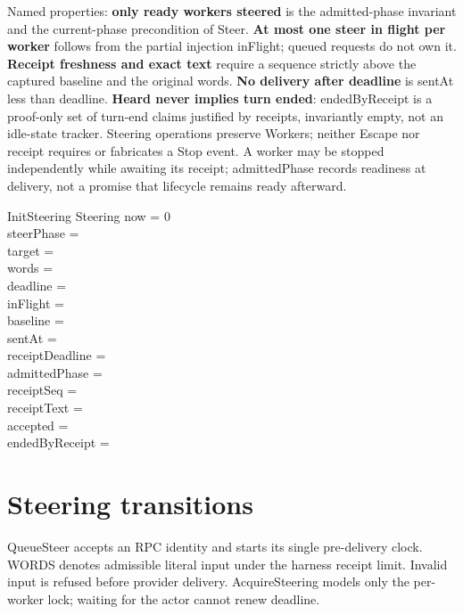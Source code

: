 \documentclass[a4paper,10pt,fleqn]{article}
\begin{document}
Named properties: \textbf{only ready workers steered} is the admitted-phase
invariant and the current-phase precondition of Steer. \textbf{At most one
steer in flight per worker} follows from the partial injection inFlight;
queued requests do not own it. \textbf{Receipt freshness and exact text}
require a sequence strictly above the captured baseline and the original
words. \textbf{No delivery after deadline} is sentAt less than deadline.
\textbf{Heard never implies turn ended}: endedByReceipt is a proof-only set of
turn-end claims justified by receipts, invariantly empty, not an idle-state
tracker. Steering operations preserve Workers; neither Escape nor receipt
requires or fabricates a Stop event. A worker may be stopped independently
while awaiting its receipt; admittedPhase records readiness at delivery, not
a promise that lifecycle remains ready afterward.

\begin{schema}{InitSteering}
  Steering
\where
  now = 0 \\
  steerPhase = \emptyset \\
  target = \emptyset \\
  words = \emptyset \\
  deadline = \emptyset \\
  inFlight = \emptyset \\
  baseline = \emptyset \\
  sentAt = \emptyset \\
  receiptDeadline = \emptyset \\
  admittedPhase = \emptyset \\
  receiptSeq = \emptyset \\
  receiptText = \emptyset \\
  accepted = \emptyset \\
  endedByReceipt = \emptyset
\end{schema}

\section{Steering transitions}

QueueSteer accepts an RPC identity and starts its single pre-delivery clock.
WORDS denotes admissible literal input under the harness receipt limit.
Invalid input is refused before provider delivery. AcquireSteering models
only the per-worker lock; waiting for the actor cannot renew deadline.
\end{document}

